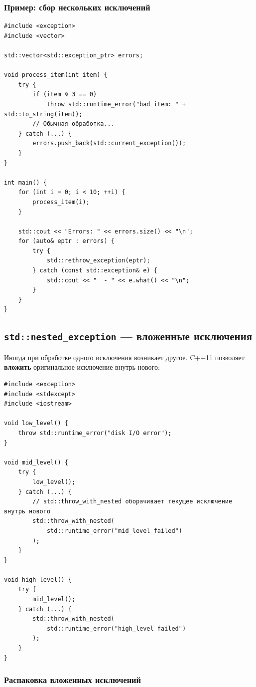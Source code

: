\documentclass[a4paper,12pt]{article}
\begin{document}
\subsubsection{Пример: сбор нескольких исключений}

\begin{lstlisting}
#include <exception>
#include <vector>

std::vector<std::exception_ptr> errors;

void process_item(int item) {
    try {
        if (item % 3 == 0)
            throw std::runtime_error("bad item: " + std::to_string(item));
        // Обычная обработка...
    } catch (...) {
        errors.push_back(std::current_exception());
    }
}

int main() {
    for (int i = 0; i < 10; ++i) {
        process_item(i);
    }

    std::cout << "Errors: " << errors.size() << "\n";
    for (auto& eptr : errors) {
        try {
            std::rethrow_exception(eptr);
        } catch (const std::exception& e) {
            std::cout << "  - " << e.what() << "\n";
        }
    }
}
\end{lstlisting}

\subsection{\texttt{std::nested\_exception} --- вложенные исключения}

Иногда при обработке одного исключения возникает другое. C++11 позволяет
\textbf{вложить} оригинальное исключение внутрь нового:

\begin{lstlisting}
#include <exception>
#include <stdexcept>
#include <iostream>

void low_level() {
    throw std::runtime_error("disk I/O error");
}

void mid_level() {
    try {
        low_level();
    } catch (...) {
        // std::throw_with_nested оборачивает текущее исключение внутрь нового
        std::throw_with_nested(
            std::runtime_error("mid_level failed")
        );
    }
}

void high_level() {
    try {
        mid_level();
    } catch (...) {
        std::throw_with_nested(
            std::runtime_error("high_level failed")
        );
    }
}
\end{lstlisting}

\subsubsection{Распаковка вложенных исключений}
\end{document}
